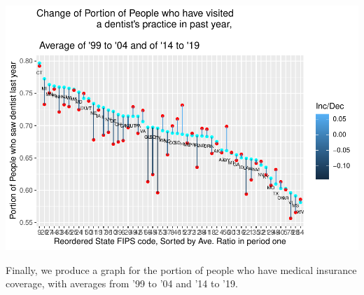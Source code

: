 \documentclass[
]{article}
\begin{document}
\includegraphics{Change_By_State_Graphic_Reproduction_files/figure-latex/unnamed-chunk-9-1.pdf}

Finally, we produce a graph for the portion of people who have medical
insurance coverage, with averages from '99 to '04 and '14 to '19.
\end{document}
